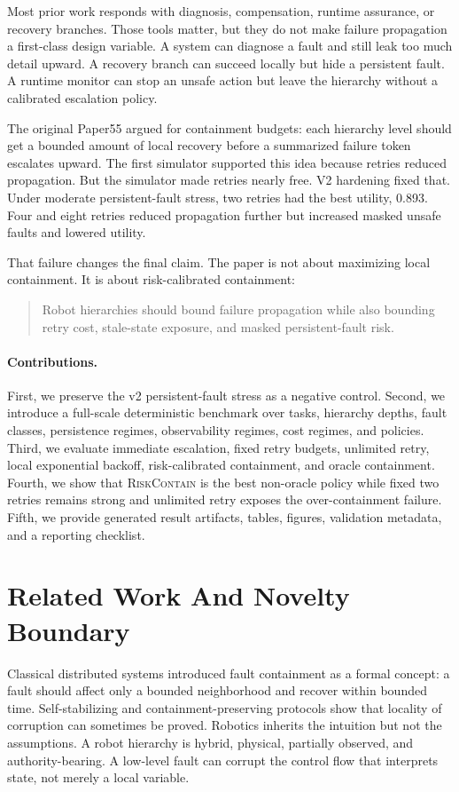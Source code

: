 \documentclass{article}
\newcommand{\method}{\textsc{RiskContain}\xspace}
\begin{document}
Most prior work responds with diagnosis, compensation, runtime assurance, or recovery branches. Those tools matter, but they do not make failure propagation a first-class design variable. A system can diagnose a fault and still leak too much detail upward. A recovery branch can succeed locally but hide a persistent fault. A runtime monitor can stop an unsafe action but leave the hierarchy without a calibrated escalation policy.

The original Paper55 argued for containment budgets: each hierarchy level should get a bounded amount of local recovery before a summarized failure token escalates upward. The first simulator supported this idea because retries reduced propagation. But the simulator made retries nearly free. V2 hardening fixed that. Under moderate persistent-fault stress, two retries had the best utility, 0.893. Four and eight retries reduced propagation further but increased masked unsafe faults and lowered utility.

That failure changes the final claim. The paper is not about maximizing local containment. It is about risk-calibrated containment:
\begin{quote}
Robot hierarchies should bound failure propagation while also bounding retry cost, stale-state exposure, and masked persistent-fault risk.
\end{quote}

\paragraph{Contributions.}
First, we preserve the v2 persistent-fault stress as a negative control. Second, we introduce a full-scale deterministic benchmark over tasks, hierarchy depths, fault classes, persistence regimes, observability regimes, cost regimes, and policies. Third, we evaluate immediate escalation, fixed retry budgets, unlimited retry, local exponential backoff, risk-calibrated containment, and oracle containment. Fourth, we show that \method is the best non-oracle policy while fixed two retries remains strong and unlimited retry exposes the over-containment failure. Fifth, we provide generated result artifacts, tables, figures, validation metadata, and a reporting checklist.

\section{Related Work And Novelty Boundary}

Classical distributed systems introduced fault containment as a formal concept: a fault should affect only a bounded neighborhood and recover within bounded time. Self-stabilizing and containment-preserving protocols show that locality of corruption can sometimes be proved. Robotics inherits the intuition but not the assumptions. A robot hierarchy is hybrid, physical, partially observed, and authority-bearing. A low-level fault can corrupt the control flow that interprets state, not merely a local variable.
\end{document}
